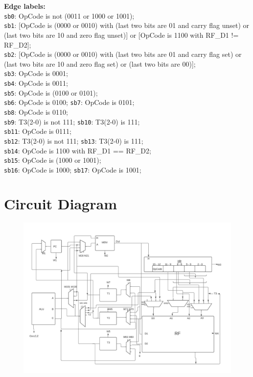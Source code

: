 \documentclass[11pt, fleqn]{article}
\begin{document}
\textbf{Edge labels:} \\
\texttt{sb0}: OpCode is not (0011 or 1000 or 1001); \\
\texttt{sb1}: [OpCode is (0000 or 0010) with (last two bits are 01 and carry flag unset) or (last two bits are 10 and zero flag unset)] or [OpCode is 1100 with  RF\_D1 != RF\_D2]; \\
\texttt{sb2}: [OpCode is (0000 or 0010) with (last two bits are 01 and carry flag set) or (last two bits are 10 and zero flag set) or (last two bits are 00)]; \\
\texttt{sb3}: OpCode is 0001; \\
\texttt{sb4}: OpCode is 0011; \\
\texttt{sb5}: OpCode is (0100 or 0101); \\
\texttt{sb6}: OpCode is 0100; \hspace*{2em} \texttt{sb7}: OpCode is 0101; \\
\texttt{sb8}: OpCode is 0110; \\
\texttt{sb9}: T3(2-0) is not 111; \hspace*{2em} \texttt{sb10}: T3(2-0) is 111; \\
\texttt{sb11}: OpCode is 0111; \\
\texttt{sb12}: T3(2-0) is not 111; \hspace*{2em} \texttt{sb13}: T3(2-0) is 111; \\
\texttt{sb14}: OpCode is 1100 with RF\_D1 == RF\_D2; \\
\texttt{sb15}: OpCode is (1000 or 1001); \\
\texttt{sb16}: OpCode is 1000; \hspace*{2em} \texttt{sb17}: OpCode is 1001;

\newpage
\section*{Circuit Diagram}
\begin{figure}[H]
    \centering
    \includegraphics[scale=0.65]{crd.jpeg}
\end{figure}
\end{document}
